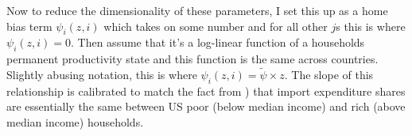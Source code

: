 \documentclass[12pt,pdftex]{article}
\begin{document}
\begin{onehalfspacing}
Now to reduce the dimensionality of these parameters, I set this up as a home bias term $\psi_{i}(z,i)$ which takes on some number and for all other $j$s this is where $\psi_{i}(z,i) = 0$. Then assume that it's a log-linear function of a households permanent productivity state and this function is the same across countries. Slightly abusing notation, this is where $\psi_{i}(z,i) = \tilde \psi \times z$. The slope of this relationship is calibrated to match the fact from \citet{borusyak2021distributional}) that import expenditure shares are essentially the same between US poor (below median income) and rich (above median income) households.


\end{onehalfspacing}
\end{document}

